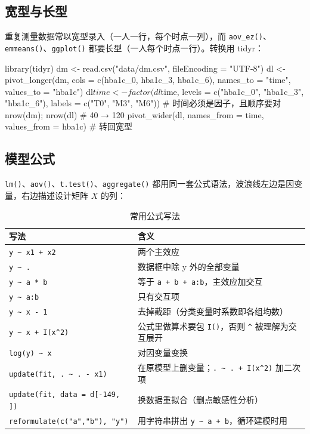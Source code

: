 \subsection{宽型与长型}
重复测量数据常以宽型录入（一人一行，每个时点一列），而 \Verb|aov_ez()|、\Verb|emmeans()|、\Verb|ggplot()| 都要长型（一人每个时点一行）。转换用 tidyr：

\begin{RCode}
library(tidyr)
dm <- read.csv("data/dm.csv", fileEncoding = "UTF-8")
dl <- pivot_longer(dm, cols = c(hba1c_0, hba1c_3, hba1c_6),
                   names_to = "time", values_to = "hba1c")
dl$time <- factor(dl$time, levels = c("hba1c_0", "hba1c_3", "hba1c_6"),
                  labels = c("T0", "M3", "M6"))       # 时间必须是因子，且顺序要对
nrow(dm); nrow(dl)                                    # 40 → 120
pivot_wider(dl, names_from = time, values_from = hba1c)   # 转回宽型
\end{RCode}

\subsection{模型公式}
\Verb|lm()|、\Verb|aov()|、\Verb|t.test()|、\Verb|aggregate()| 都用同一套公式语法，波浪线左边是因变量，右边描述设计矩阵 $X$ 的列：

\begin{table}[htbp]
\centering\small
\caption{常用公式写法}
\begin{tabular}{@{}ll@{}}
\toprule
写法 & 含义\\
\midrule
\Verb|y ~ x1 + x2| & 两个主效应\\
\Verb|y ~ .| & 数据框中除 y 外的全部变量\\
\Verb|y ~ a * b| & 等于 \Verb|a + b + a:b|，主效应加交互\\
\Verb|y ~ a:b| & 只有交互项\\
\Verb|y ~ x - 1| & 去掉截距（分类变量时系数即各组均数）\\
\Verb|y ~ x + I(x^2)| & 公式里做算术要包 \Verb|I()|，否则 \Verb|^| 被理解为交互展开\\
\Verb|log(y) ~ x| & 对因变量变换\\
\Verb|update(fit, . ~ . - x1)| & 在原模型上删变量；\Verb|. ~ . + I(x^2)| 加二次项\\
\Verb|update(fit, data = d[-149, ])| & 换数据重拟合（删点敏感性分析）\\
\Verb|reformulate(c("a","b"), "y")| & 用字符串拼出 \Verb|y ~ a + b|，循环建模时用\\
\bottomrule
\end{tabular}
\end{table}

